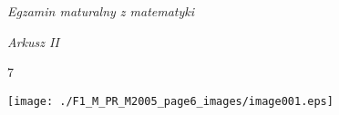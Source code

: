 \documentclass[a4paper,12pt]{article}
\begin{document}
{\it Egzamin maturalny z matematyki}

{\it Arkusz II}

7
\begin{center}
\texttt{[image: ./F1\_M\_PR\_M2005\_page6\_images/image001.eps]}
\end{center}
\end{document}
